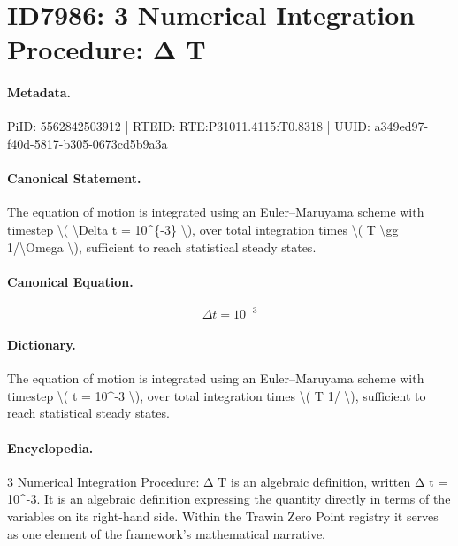 \section*{ID7986: 3 Numerical Integration Procedure: Δ T}
\paragraph{Metadata.}
PiID: 5562842503912 | RTEID: RTE:P31011.4115:T0.8318 | UUID: a349ed97-f40d-5817-b305-0673cd5b9a3a

\paragraph{Canonical Statement.}
The equation of motion is integrated using an Euler–Maruyama scheme with timestep \textbackslash{}( \textbackslash{}Delta t = 10\textasciicircum{}\{-3\} \textbackslash{}), over total integration times \textbackslash{}( T \textbackslash{}gg 1/\textbackslash{}Omega \textbackslash{}), sufficient to reach statistical steady states.

\paragraph{Canonical Equation.}
\[
\Delta t = 10^{-3}
\]

\paragraph{Dictionary.}
The equation of motion is integrated using an Euler–Maruyama scheme with timestep \textbackslash{}( t = 10\textasciicircum{}-3 \textbackslash{}), over total integration times \textbackslash{}( T 1/ \textbackslash{}), sufficient to reach statistical steady states.

\paragraph{Encyclopedia.}
3 Numerical Integration Procedure: Δ T is an algebraic definition, written Δ t = 10\textasciicircum{}-3. It is an algebraic definition expressing the quantity directly in terms of the variables on its right-hand side. Within the Trawin Zero Point registry it serves as one element of the framework's mathematical narrative.
